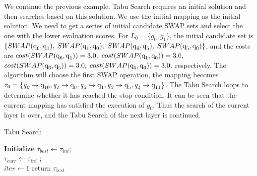 \documentclass[runningheads]{llncs}
\begin{document}
\begin{example}
	We continue the previous example. Tabu Search requires an initial solution and then searches based on this solution.  We use the initial mapping as the initial solution. We need to get a series of initial candidate SWAP sets and select the one with the lower evaluation scores.
For $L_{0}=\{g_{0},g_{1}\}$, the initial candidate set is 
$\{SWAP(\textup{q}_\textup{6},\textup{q}_\textup{1}),$ $SWAP(\textup{q}_\textup{1},\textup{q}_\textup{0}),$ $SWAP(\textup{q}_\textup{6},\textup{q}_\textup{5}),$ $SWAP(\textup{q}_\textup{5},\textup{q}_\textup{0}) \}$, and the costs are
$cost(SWAP(\textup{q}_\textup{6},\textup{q}_\textup{1}))=3.0,$ $cost(SWAP(\textup{q}_\textup{1},\textup{q}_\textup{0}))=3.0,$\\ $cost(SWAP(\textup{q}_\textup{6},\textup{q}_\textup{5}))=3.0,$ $cost(SWAP(\textup{q}_\textup{5},\textup{q}_\textup{0}))=3.0$, respectively.
The algorithm will choose the first SWAP operation, the mapping becomes $\tau_{0}=\{\textit{q}_\textit{0}\rightarrow  \textup{q}_\textup{10},\textit{q}_\textit{1}\rightarrow  \textup{q}_\textup{0},
\textit{q}_\textit{2}\rightarrow  \textup{q}_\textup{1},\textit{q}_\textit{3}\rightarrow  \textup{q}_\textup{5},\textit{q}_\textit{4}\rightarrow  \textup{q}_\textup{11}\}$. 
The Tabu Search loops to determine whether it has reached the stop condition. It can be seen that the current mapping has satisfied the execution of $g_{0}$. Thus the search of the current layer is over, and the Tabu Search of the next layer is continued.
\end{example}
			\begin{algorithm} 
			\label{algorithm_Tabu}
				\caption{Tabu Search }  
				\LinesNumbered  
				\textbf{Initialize}
					$\tau_{best}  \leftarrow \tau_{ini}$; \\
					$\tau_{curr} \leftarrow \tau_{ini}$ ;\\
					$iter \leftarrow 1$  
				return $\tau_{best}$
				\end{algorithm}
\end{document}
